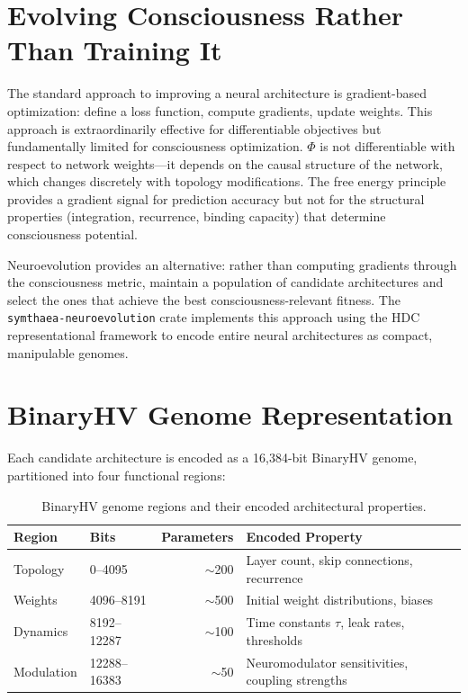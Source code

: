 \documentclass[12pt]{book}
\begin{document}
\section{Evolving Consciousness Rather Than Training It}

The standard approach to improving a neural architecture is gradient-based optimization: define a loss function, compute gradients, update weights. This approach is extraordinarily effective for differentiable objectives but fundamentally limited for consciousness optimization. $\Phi$ is not differentiable with respect to network weights---it depends on the causal structure of the network, which changes discretely with topology modifications. The free energy principle provides a gradient signal for prediction accuracy but not for the structural properties (integration, recurrence, binding capacity) that determine consciousness potential.

Neuroevolution provides an alternative: rather than computing gradients through the consciousness metric, maintain a population of candidate architectures and select the ones that achieve the best consciousness-relevant fitness. The \texttt{symthaea-neuroevolution} crate implements this approach using the HDC representational framework to encode entire neural architectures as compact, manipulable genomes.

\section{BinaryHV Genome Representation}

Each candidate architecture is encoded as a 16,384-bit BinaryHV genome, partitioned into four functional regions:

\begin{table}[htbp]
\centering
\caption{BinaryHV genome regions and their encoded architectural properties.}
\label{tab:genome-regions}
\begin{tabular}{@{}llrl@{}}
\toprule
\textbf{Region} & \textbf{Bits} & \textbf{Parameters} & \textbf{Encoded Property} \\
\midrule
Topology      & 0--4095       & $\sim$200 & Layer count, skip connections, recurrence \\
Weights       & 4096--8191    & $\sim$500 & Initial weight distributions, biases \\
Dynamics      & 8192--12287   & $\sim$100 & Time constants $\tau$, leak rates, thresholds \\
Modulation    & 12288--16383  & $\sim$50  & Neuromodulator sensitivities, coupling strengths \\
\bottomrule
\end{tabular}
\end{table}
\end{document}
